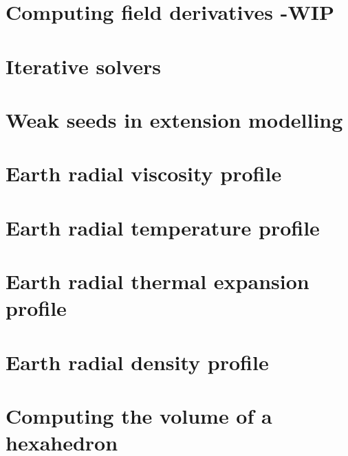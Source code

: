 \section{Computing field derivatives -WIP} \label{ss:nodderiv}  %
\newpage %
\section{Iterative solvers \label{ss:itsolvers}}  %
\newpage %
\section{Weak seeds in extension modelling \label{ss:weakseeds}}  %
\newpage %
\section{Earth radial viscosity profile \label{ss:viscprof}}  %
\newpage %
\section{Earth radial temperature profile \label{ss:adiab}}  %
\newpage %
\section{Earth radial thermal expansion profile}  %
\newpage %
\section{Earth radial density profile}  %
\newpage %
\section{Computing the volume of a hexahedron}  %
\newpage %
